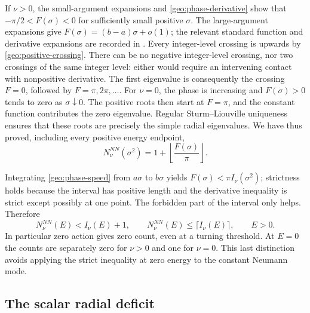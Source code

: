 \documentclass[11pt,reqno]{amsart}
\numberwithin{equation}{section}
\begin{document}
If $\nu>0$, the small-argument expansions and
\eqref{geo:phase-derivative} show that
$-\pi/2<F(\sigma)<0$ for sufficiently small positive $\sigma$.
The large-argument expansions give
$F(\sigma)=(b-a)\sigma+o(1)$; the relevant standard function and
derivative expansions are recorded in \cite[Sections 10.7 and 10.17]{DLMF}.
Every integer-level crossing is upwards by
\eqref{geo:positive-crossing}.  There can be no negative integer-level
crossing, nor two crossings of the same integer level: either would
require an intervening contact with nonpositive derivative.  The first
eigenvalue is consequently the crossing $F=0$, followed by
$F=\pi,2\pi,\ldots$.  For $\nu=0$, the phase is increasing and
$F(\sigma)>0$ tends to zero as $\sigma\downarrow0$.  The positive roots
then start at $F=\pi$, and the constant function contributes the zero
eigenvalue.  Regular Sturm--Liouville uniqueness ensures that these
roots are precisely the simple radial eigenvalues.  We have thus proved,
including every positive energy endpoint,
\begin{equation}\label{geo:radial-floor}
 N_\nu^{NN}(\sigma^2)=1+
          \left\lfloor\frac{F(\sigma)}\pi\right\rfloor.
\end{equation}

Integrating \eqref{geo:phase-speed} from $a\sigma$ to $b\sigma$ yields
$F(\sigma)<\pi I_\nu(\sigma^2)$; strictness holds because the interval
has positive length and the derivative inequality is strict except
possibly at one point.  The forbidden part of the interval only helps.
Therefore
\begin{equation}\label{geo:radial-action}
 N_\nu^{NN}(E)<I_\nu(E)+1,
 \qquad N_\nu^{NN}(E)\le\lceil I_\nu(E)\rceil,
 \qquad E>0.
\end{equation}
In particular zero action gives zero count, even at a turning threshold.
At $E=0$ the counts are separately zero for $\nu>0$ and one for $\nu=0$.
This last distinction avoids applying the strict inequality at zero
energy to the constant Neumann mode.

\subsection{The scalar radial deficit}
\label{geo:scalar}
\end{document}
